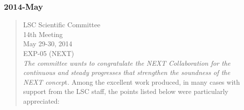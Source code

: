 \subsubsection*{2014-May}
\begin{quotation}
LSC Scientific Committee \\
14th Meeting\\
May 29-30, 2014\\

EXP-05 (NEXT)\\

{\em The committee wants to congratulate the NEXT Collaboration for the continuous and steady progresses that strengthen the soundness of the NEXT concep}t. Among the excellent work produced, in many cases with support from the LSC staff, the points listed below were particularly appreciated:


\end{quotation}
